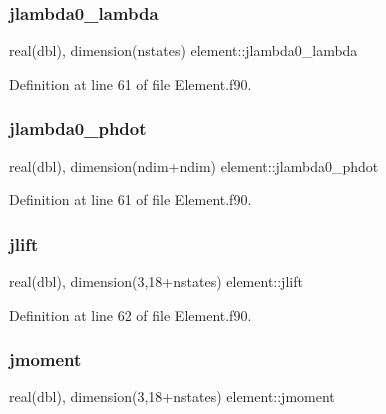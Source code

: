 \subsubsection{\texorpdfstring{jlambda0\+\_\+lambda}{jlambda0\_lambda}}
{\footnotesize\ttfamily real(dbl), dimension(nstates) element\+::jlambda0\+\_\+lambda\hspace{0.3cm}{\ttfamily [private]}}



Definition at line 61 of file Element.\+f90.

\mbox{\label{namespaceelement_a7c62d3aab34ad67ea920d7293726205e}} 
\subsubsection{\texorpdfstring{jlambda0\+\_\+phdot}{jlambda0\_phdot}}
{\footnotesize\ttfamily real(dbl), dimension(ndim+ndim) element\+::jlambda0\+\_\+phdot\hspace{0.3cm}{\ttfamily [private]}}



Definition at line 61 of file Element.\+f90.

\mbox{\label{namespaceelement_a2cc8d4739c02a1302e8c31d681c70eb8}} 
\subsubsection{\texorpdfstring{jlift}{jlift}}
{\footnotesize\ttfamily real(dbl), dimension(3,18+nstates) element\+::jlift\hspace{0.3cm}{\ttfamily [private]}}



Definition at line 62 of file Element.\+f90.

\mbox{\label{namespaceelement_ac6e33874e30f493a8e29de4f0c87af0a}} 
\subsubsection{\texorpdfstring{jmoment}{jmoment}}
{\footnotesize\ttfamily real(dbl), dimension(3,18+nstates) element\+::jmoment\hspace{0.3cm}{\ttfamily [private]}}



